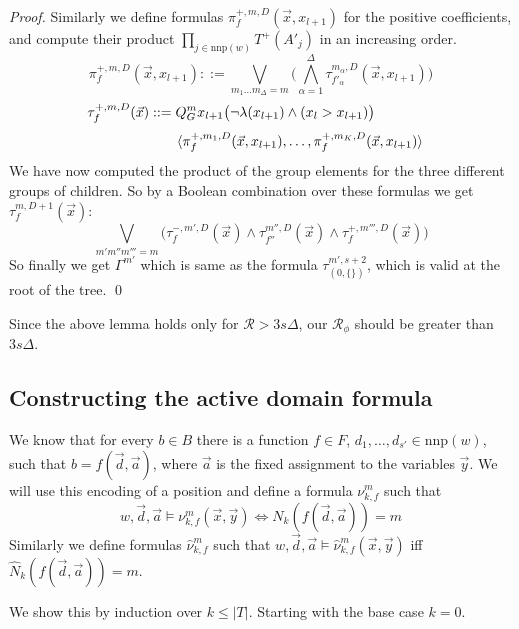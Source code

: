 \documentclass[envcountsame]{llncs}
\newcommand{\mon}[2]{Q_{#1}^{#2}}
\newcommand{\nnp}{\mathrm{nnp}}
\newcommand{\defs}{::=}
\begin{document}
\begin{proof}
Similarly we define formulas $\pi^{+,m,D}_f(\vec x,x_{l+1})$ for the positive coefficients, and compute their product $\prod_{j\in\nnp(w)} T^+(A'_j)$ in an increasing order.
$$\pi^{+,m,D}_f(\vec x,x_{l+1}) \defs \bigvee_{m_{1}\dots m_{\Delta}=m} \bigg(\bigwedge_{\alpha=1}^{\Delta}
\tau^{m_{\alpha},D}_{f'_{\alpha}}(\vec x,x_{l+1})\bigg)$$
$$\tau^{+,m,D}_{f}(\vec x) \defs \mon{G}{m} x_{l+1} \big(\neg \lambda(x_{l+1}) \wedge (x_l > x_{l+1})\big)\hspace*{1.5cm}$$
$$\hspace*{2cm}\langle \pi_f^{+,m_1,D}(\vec x,x_{l+1}),\dots, \pi_f^{+,m_K,D}(\vec x,x_{l+1})\rangle$$
We have now computed the product of the group elements for the three different groups of children. So by a Boolean combination over
these formulas we get $\tau^{m,D+1}_{f}(\vec x)$:
$$\bigvee_{m'm''m'''=m} \big(\tau^{-,m',D}_{f}(\vec x) \wedge \tau^{m'',D}_{f''}(\vec x) \wedge \tau^{+,m''',D}_{f}(\vec x)\big)$$
So finally we get $\Gamma^{m'}$ which is same as the formula $\tau_ {(0,\{\})}^{m',s+2}$, which is valid at the root of the tree.
\qed \end{proof}

Since the above lemma holds only for $\mathcal{R}>3s\Delta$, our $\mathcal{R}_{\phi}$ should be greater than $3s \Delta$.
 
\subsection{Constructing the active domain formula} 
We know that for every $b\in B$ there is a function $f\in F$, $d_1,\dots,d_{s'}\in\nnp(w)$, such that $b=f(\vec d,\vec a)$, where $\vec
a$ is the fixed assignment to the variables $\vec y$.
We will use this encoding of a position and define a formula $\nu^m_{k,f}$ such that 
$$w,\vec d, \vec a\models \nu^m_{k,f}(\vec x,\vec y) \Leftrightarrow N_k(f(\vec d,\vec a))=m$$
Similarly we define formulas $\hat \nu^m_{k,f}$ such that $w, \vec d, \vec a \models \hat \nu^m_{k,f}(\vec
x, \vec y)$ iff $\hat N_k(f(\vec d, \vec a))=m$.

We show this by induction over $k\leq |T|$. Starting with the base case $k=0$.
\end{document}
